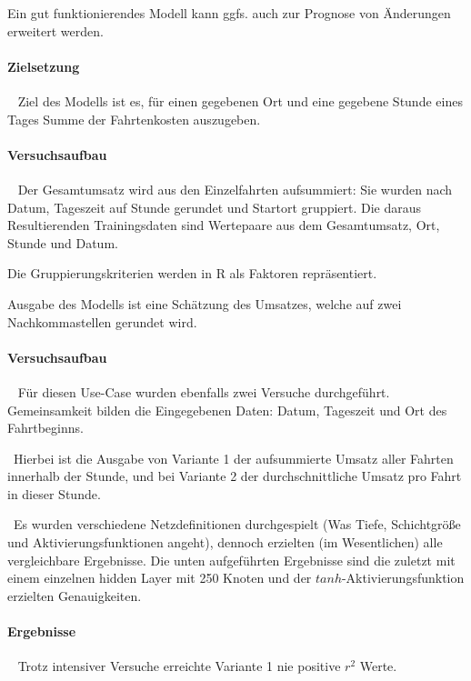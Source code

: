 Ein gut funktionierendes Modell kann ggfs. auch zur Prognose von Änderungen erweitert werden.
\paragraph{Zielsetzung} ~\newline
Ziel des Modells ist es, für einen gegebenen Ort und eine gegebene Stunde eines Tages Summe der Fahrtenkosten auszugeben. 

\paragraph{Versuchsaufbau} ~\newline
Der Gesamtumsatz wird aus den Einzelfahrten aufsummiert: Sie wurden nach Datum, Tageszeit auf Stunde gerundet und Startort gruppiert. Die daraus Resultierenden Trainingsdaten sind Wertepaare aus dem Gesamtumsatz, Ort, Stunde und Datum. 

Die Gruppierungskriterien werden in R als Faktoren repräsentiert. 

Ausgabe des Modells ist eine Schätzung des Umsatzes, welche auf zwei Nachkommastellen gerundet wird. 

\paragraph{Versuchsaufbau} ~\newline
Für diesen Use-Case wurden ebenfalls zwei Versuche durchgeführt. Gemeinsamkeit bilden die Eingegebenen Daten: Datum, Tageszeit und Ort des Fahrtbeginns. 

~\newline Hierbei ist die Ausgabe von Variante 1 der aufsummierte Umsatz aller Fahrten innerhalb der Stunde, und bei Variante 2 der durchschnittliche Umsatz pro Fahrt in dieser Stunde. 

~\newline Es wurden verschiedene Netzdefinitionen durchgespielt (Was Tiefe, Schichtgröße und Aktivierungsfunktionen angeht), dennoch erzielten (im Wesentlichen) alle vergleichbare Ergebnisse. Die unten aufgeführten Ergebnisse sind die zuletzt mit einem einzelnen hidden Layer mit 250 Knoten und der $tanh$-Aktivierungsfunktion erzielten Genauigkeiten.
\paragraph{Ergebnisse} ~\newline
Trotz intensiver Versuche erreichte Variante 1 nie positive $r^2$ Werte. 

